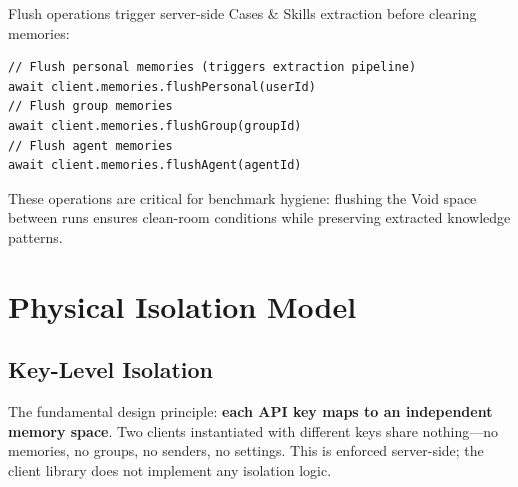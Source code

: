 \documentclass[11pt, a4paper]{article}
\begin{document}
Flush operations trigger server-side Cases \& Skills extraction before clearing memories:

\begin{lstlisting}[caption={Flush operations (from \texttt{everos.ts}:199--220)}]
// Flush personal memories (triggers extraction pipeline)
await client.memories.flushPersonal(userId)
// Flush group memories
await client.memories.flushGroup(groupId)
// Flush agent memories
await client.memories.flushAgent(agentId)
\end{lstlisting}

These operations are critical for benchmark hygiene: flushing the Void space between runs ensures clean-room conditions while preserving extracted knowledge patterns.

\section{Physical Isolation Model}

\subsection{Key-Level Isolation}

The fundamental design principle: \textbf{each API key maps to an independent memory space}. Two clients instantiated with different keys share nothing---no memories, no groups, no senders, no settings. This is enforced server-side; the client library does not implement any isolation logic.
\end{document}
